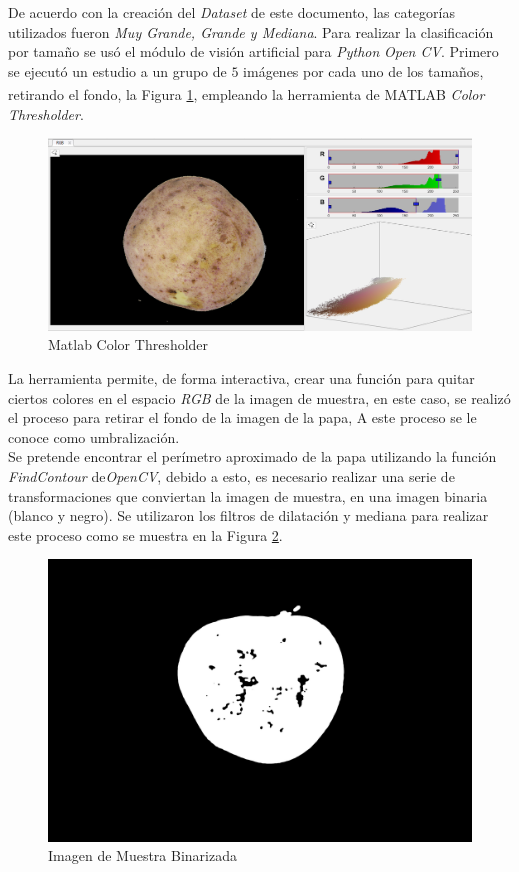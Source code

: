 De acuerdo con la creación del \textit{Dataset} de este documento, las categorías utilizados fueron \textit{Muy Grande, Grande y Mediana}. Para realizar la clasificación por tamaño se usó el módulo de visión artificial para \textit{Python} \textit{Open CV}. Primero se ejecutó un estudio a un grupo de $5$ imágenes por cada uno de los tamaños, retirando el fondo, la Figura \ref{fig:matlabcv}, empleando la herramienta de MATLAB\textsuperscript{\textregistered} \textit{Color Thresholder}.


\begin{figure}[ht]
	\centering
	\includegraphics[scale=0.3]{Figs/matlabcv.png}
	\caption{Matlab Color Thresholder}
	\label{fig:matlabcv}
\end{figure}

La herramienta permite, de forma interactiva, crear una función para quitar ciertos colores en el espacio \textit{RGB} de la imagen de muestra, en este caso, se realizó el proceso para retirar el fondo de la imagen de la papa, A este proceso se le conoce como umbralización. \\

Se pretende encontrar el perímetro aproximado de la papa utilizando la función \textit{FindContour} de\textit{OpenCV}, debido a esto, es necesario realizar una serie de transformaciones que conviertan la imagen de muestra, en una imagen binaria (blanco y negro). Se utilizaron los filtros de dilatación y mediana para realizar este proceso como se muestra en la Figura \ref{fig:dilmed}.	

\begin{figure}[ht]
	\centering
	\includegraphics[scale=0.05]{Figs/dilmed.png}
	\caption{Imagen de Muestra Binarizada}
	\label{fig:dilmed}
\end{figure}

